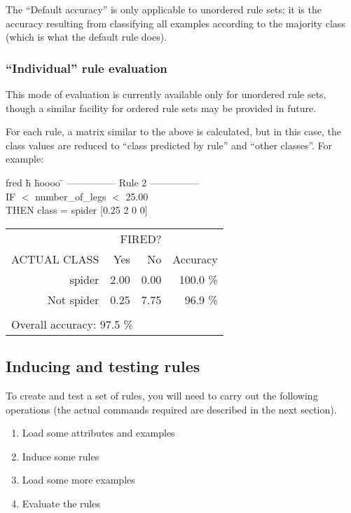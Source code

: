 The ``Default accuracy'' is only applicable to unordered
rule sets; it is the accuracy resulting from classifying
all examples according to the majority class (which is what
the default rule does).

\subsubsection{``Individual'' rule evaluation}
This mode of evaluation is currently available only for unordered
rule sets, though a similar facility for ordered rule sets may be
provided in future. 

For each rule, a matrix similar to the above is calculated, but
in this case, the class values are reduced to ``class predicted by
rule'' and ``other classes''.  For example:

\begin{tabbing}
fred \= h \= hoooo \= \kill
\> --------------- Rule 2 --------------- \\
\>IF \> $<$ number\_of\_legs $<$ 25.00   \\
\>THEN \>\> class = spider  [0.25 2 0 0]
\end{tabbing}

\begin{tabular}{rr|rr|r} 
\multicolumn{4}{r}{FIRED?} \\
\multicolumn{2}{l|}{ACTUAL CLASS} & 
             Yes  &   No &    Accuracy \\ \cline{2-5}
\raisebox{1.5ex}{\rule{0mm}{1ex}}    
&    spider  &  2.00  &  0.00  &  100.0 \% \\
& Not spider &  0.25  &  7.75  &   96.9 \% \\
\multicolumn{4}{l}{} \\
\multicolumn{4}{l}{Overall accuracy: 97.5 \%}
\end{tabular}



\subsection{Inducing and testing rules}
To create and  test a set of rules, you will need to carry out the 
following operations (the actual commands required are described
in the next section).

\begin{enumerate}
 \item Load some attributes and examples
 \item Induce some rules
 \item Load some more examples
 \item Evaluate the rules
\end{enumerate}

